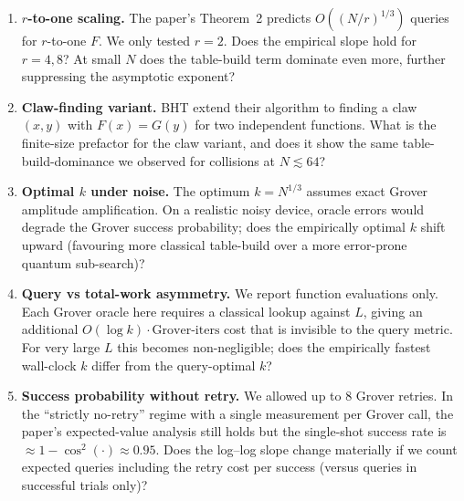 \documentclass[11pt]{article}
\begin{document}
\begin{enumerate}
  \item[\textbf{Q1}] \textbf{$r$-to-one scaling.} The paper's Theorem~2
        predicts $O((N/r)^{1/3})$ queries for $r$-to-one $F$. We only tested
        $r{=}2$. Does the empirical slope hold for $r{=}4, 8$? At small $N$
        does the table-build term dominate even more, further suppressing the
        asymptotic exponent?
  \item[\textbf{Q2}] \textbf{Claw-finding variant.} BHT extend their algorithm
        to finding a claw $(x, y)$ with $F(x)=G(y)$ for two independent
        functions. What is the finite-size prefactor for the claw variant, and
        does it show the same table-build-dominance we observed for
        collisions at $N \lesssim 64$?
  \item[\textbf{Q3}] \textbf{Optimal $k$ under noise.} The optimum $k{=}N^{1/3}$
        assumes exact Grover amplitude amplification. On a realistic noisy
        device, oracle errors would degrade the Grover success probability;
        does the empirically optimal $k$ shift upward (favouring more
        classical table-build over a more error-prone quantum sub-search)?
  \item[\textbf{Q4}] \textbf{Query vs total-work asymmetry.} We report
        function evaluations only. Each Grover oracle here requires a
        classical lookup against $L$, giving an additional
        $O(\log k) \cdot \text{Grover-iters}$ cost that is invisible to the
        query metric. For very large $L$ this becomes non-negligible; does
        the empirically fastest wall-clock $k$ differ from the query-optimal $k$?
  \item[\textbf{Q5}] \textbf{Success probability without retry.} We allowed
        up to 8 Grover retries. In the ``strictly no-retry'' regime with a
        single measurement per Grover call, the paper's expected-value analysis
        still holds but the single-shot success rate is $\approx 1 - \cos^2(\cdot) \approx 0.95$.
        Does the log--log slope change materially if we count expected queries
        including the retry cost per success (versus queries in successful trials only)?
\end{enumerate}
\end{document}
